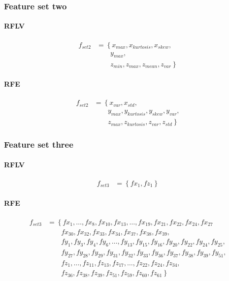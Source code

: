 \documentclass[USenglish]{ifimaster}  %
\begin{document}
\subsubsection{Feature set two}
\paragraph{RFLV}
\begin{align}
f_{set2} &= \left\{x_{max}, x_{kurtosis}, x_{skew}, \right.\nonumber\\
&\qquad \left.{} y_{max}, \right.\nonumber\\
&\qquad \left.{} z_{min}, z_{max}, z_{mean}, z_{var} \right\}
\end{align}

\paragraph{RFE}
\begin{align}
f_{set2} &= \left\{x_{var}, x_{std}, \right.\nonumber\\
&\qquad \left.{} y_{max}, y_{kurtosis}, y_{skew}, y_{var}, \right.\nonumber\\
&\qquad \left.{} z_{max}, z_{kurtosis}, z_{var}, z_{std} \right\}
\end{align}


\subsubsection{Feature set three}
\paragraph{RFLV}
\begin{align}
f_{set3} &= \left\{fx_{1}, fz_{1} \right\}
\end{align}


\paragraph{RFE}
\begin{align}
f_{set3} &= \left\{fx_{1},\dotsc,fx_{8}, fx_{10},fx_{13},\dotsc,fx_{19},fx_{21},fx_{22},fx_{24},fx_{27} \right.\nonumber\\
&\qquad \left.{}  fx_{30},fx_{32},fx_{33},fx_{34},fx_{37},fx_{38},fx_{39}, \right.\nonumber\\
&\qquad \left.{}  fy_{1},fy_{3},fy_{4},fy_{6},\dotsc,fy_{13},fy_{15},fy_{16},fy_{20},fy_{22},fy_{24},fy_{25}, \right.\nonumber\\
&\qquad \left.{} fy_{27},fy_{28},fy_{29},fy_{31},fy_{32},fy_{33},fy_{36},fy_{37},fy_{38},fy_{39},fy_{51}, \right.\nonumber\\
&\qquad \left.{} fz_{1},\dotsc,fz_{11},fz_{13},fz_{17},\dotsc,fz_{22},fz_{24},fz_{34},  \right.\nonumber\\
&\qquad \left.{} fz_{36},fz_{38},fz_{39},fz_{51},fz_{59},fz_{60},fz_{61} \right\}
\end{align}
\end{document}
